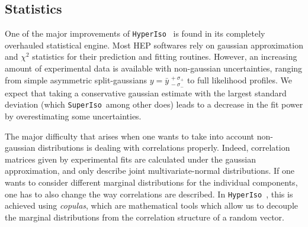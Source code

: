 \documentclass[preprint,11pt]{elsarticle}
\newcommand{\hi}{\texttt{HyperIso}}
\newcommand{\spi}{\texttt{SuperIso}}
\begin{document}
\subsection{Statistics}
One of the major improvements of \hi~ is found in its completely overhauled statistical engine. Most HEP softwares rely on gaussian approximation and $\chi^2$ statistics for their prediction and fitting routines. However, an increasing amount of experimental data is available with non-gaussian uncertainties, ranging from simple asymmetric split-gaussians $y={\bar y}^{\,+\sigma_+}_{\,-\sigma_-}$ to full likelihood profiles. We expect that taking a conservative gaussian estimate with the largest standard deviation (which \spi~among other does) leads to a decrease in the fit power by overestimating some uncertainties.

The major difficulty that arises when one wants to take into account non-gaussian distributions is dealing with correlations properly. Indeed, correlation matrices given by experimental fits are calculated under the gaussian approximation, and only describe joint multivariate-normal distributions. If one wants to consider different marginal distributions for the individual components, one has to also change the way correlations are described. In \hi~, this is achieved using \textit{copulas}, which are mathematical tools which allow us to decouple the marginal distributions from the correlation structure of a random vector.
\end{document}
